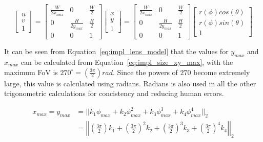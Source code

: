 \begin{equation}
    \begin{bmatrix}
        u \\ v \\ 1
    \end{bmatrix} = \begin{bmatrix}
        \frac{W}{2x_{max}} & 0 & \frac{W}{2} \\
        0 & \frac{H}{2y_{max}} & \frac{H}{2} \\
        0 & 0 & 1
    \end{bmatrix}\begin{bmatrix}
        x \\ y \\ 1
    \end{bmatrix} =
    \begin{bmatrix}
        \frac{W}{2x_{max}} & 0 & \frac{W}{2} \\
        0 & \frac{H}{2y_{max}} & \frac{H}{2} \\
        0 & 0 & 1
    \end{bmatrix}\begin{bmatrix}
        r(\phi) cos(\theta) \\ r(\phi) sin(\theta) \\ 1
    \end{bmatrix}
    \label{eq:impl_pixel_transform_final}
\end{equation}

It can be seen from Equation~\eqref{eq:impl_lens_model} that the values for $y_{max}$ and $x_{max}$ can be calculated from Equation~\eqref{eq:impl_size_xy_max}, with the maximum FoV is $270^\circ = \left(\frac{3 \pi}{2}\right) rad$. Since the powers of $270$ become extremely large, this value is calculated using radians. Radians is also used in all the other trigonometric calculations for concistency and reducing human errors.

\begin{equation}
    \begin{aligned}
        x_{max} = y_{max} &= ||k_1 \phi_{max} + k_2 \phi_{max}^2 + k_3 \phi_{max}^3 + k_4 \phi_{max}^4 ||_2 \\
        &= \left|\left| \left(\frac{3 \pi}{2}\right)k_1 + \left(\frac{3 \pi}{2}\right)^2 k_2 + \left(\frac{3 \pi}{2}\right)^3 k_3 + \left(\frac{3 \pi}{2}\right)^4 k_4 \right|\right|_2
    \end{aligned}
    \label{eq:impl_size_xy_max}
\end{equation}

